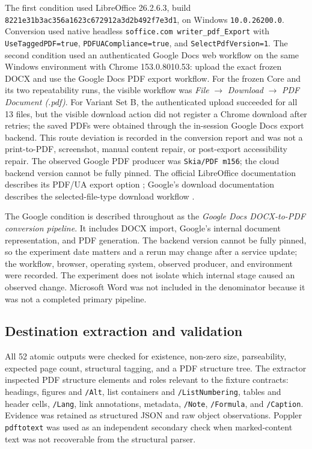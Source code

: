 The first condition used LibreOffice 26.2.6.3, build \texttt{8221e31b3ac356a1623c672912a3d2b492f7e3d1}, on Windows \texttt{10.0.26200.0}. Conversion used native headless \texttt{soffice.com writer\_pdf\_Export} with \texttt{UseTaggedPDF=true}, \texttt{PDFUACompliance=true}, and \texttt{SelectPdfVersion=1}. The second condition used an authenticated Google Docs web workflow on the same Windows environment with Chrome 153.0.8010.53: upload the exact frozen DOCX and use the Google Docs PDF export workflow. For the frozen Core and its two repeatability runs, the visible workflow was \textit{File} $\rightarrow$ \textit{Download} $\rightarrow$ \textit{PDF Document (.pdf)}. For Variant Set B, the authenticated upload succeeded for all 13 files, but the visible download action did not register a Chrome download after retries; the saved PDFs were obtained through the in-session Google Docs export backend. This route deviation is recorded in the conversion report and was not a print-to-PDF, screenshot, manual content repair, or post-export accessibility repair. The observed Google PDF producer was \texttt{Skia/PDF m156}; the cloud backend version cannot be fully pinned. The official LibreOffice documentation describes its PDF/UA export option \cite{libreoffice-pdfua}; Google's download documentation describes the selected-file-type download workflow \cite{google-docs-download}.

The Google condition is described throughout as the \emph{Google Docs DOCX-to-PDF conversion pipeline}. It includes DOCX import, Google's internal document representation, and PDF generation. The backend version cannot be fully pinned, so the experiment date matters and a rerun may change after a service update; the workflow, browser, operating system, observed producer, and environment were recorded. The experiment does not isolate which internal stage caused an observed change. Microsoft Word was not included in the denominator because it was not a completed primary pipeline.

\subsection{Destination extraction and validation}

All 52 atomic outputs were checked for existence, non-zero size, parseability, expected page count, structural tagging, and a PDF structure tree. The extractor inspected PDF structure elements and roles relevant to the fixture contracts: headings, figures and \texttt{/Alt}, list containers and \texttt{/ListNumbering}, tables and header cells, \texttt{/Lang}, link annotations, metadata, \texttt{/Note}, \texttt{/Formula}, and \texttt{/Caption}. Evidence was retained as structured JSON and raw object observations. Poppler \texttt{pdftotext} was used as an independent secondary check when marked-content text was not recoverable from the structural parser.

